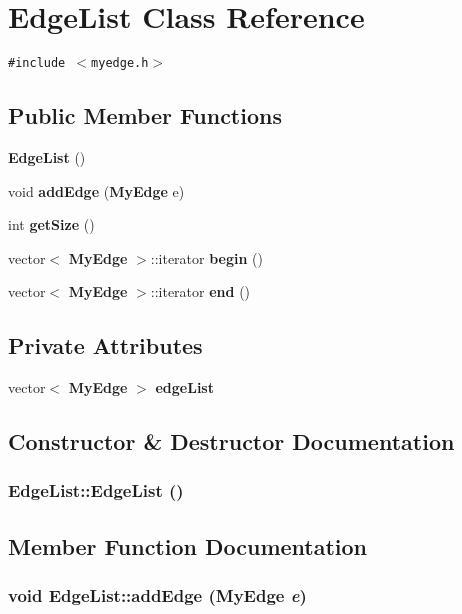 \section{EdgeList Class Reference}
\label{classEdgeList}
{\tt \#include $<$myedge.h$>$}

\subsection*{Public Member Functions}
\begin{CompactItemize}
\item 
{\bf EdgeList} ()
\item 
void {\bf addEdge} ({\bf MyEdge} e)
\item 
int {\bf getSize} ()
\item 
vector$<$ {\bf MyEdge} $>$::iterator {\bf begin} ()
\item 
vector$<$ {\bf MyEdge} $>$::iterator {\bf end} ()
\end{CompactItemize}
\subsection*{Private Attributes}
\begin{CompactItemize}
\item 
vector$<$ {\bf MyEdge} $>$ {\bf edgeList}
\end{CompactItemize}


\subsection{Constructor \& Destructor Documentation}
\subsubsection{\setlength{\rightskip}{0pt plus 5cm}EdgeList::EdgeList ()}\label{classEdgeList_ae4da15044dbea245b4b3b7f2876b3f6}




\subsection{Member Function Documentation}
\subsubsection{\setlength{\rightskip}{0pt plus 5cm}void EdgeList::addEdge ({\bf MyEdge} {\em e})\hspace{0.3cm}{\tt  [inline]}}\label{classEdgeList_fb734ef2756a8c48cd9a89111580091a}


